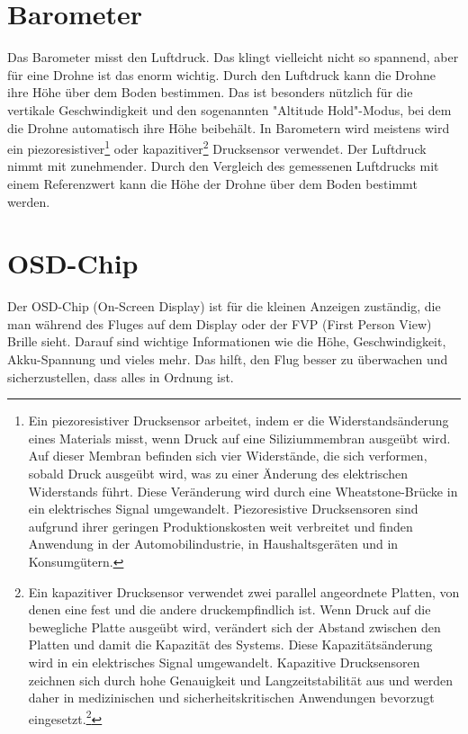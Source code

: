   \section{Barometer }  
Das Barometer misst den Luftdruck. Das klingt vielleicht nicht so spannend, aber für eine Drohne ist das enorm wichtig. Durch den Luftdruck kann die Drohne ihre Höhe über dem Boden bestimmen. Das ist besonders nützlich für die vertikale Geschwindigkeit und den sogenannten "Altitude Hold"-Modus, bei dem die Drohne automatisch ihre Höhe beibehält. In Barometern wird meistens wird ein piezoresistiver\footnote{Ein piezoresistiver Drucksensor arbeitet, indem er die Widerstandsänderung eines Materials misst, wenn Druck auf eine Siliziummembran ausgeübt wird. Auf dieser Membran befinden sich vier Widerstände, die sich verformen, sobald Druck ausgeübt wird, was zu einer Änderung des elektrischen Widerstands führt. Diese Veränderung wird durch eine Wheatstone-Brücke in ein elektrisches Signal umgewandelt. Piezoresistive Drucksensoren sind aufgrund ihrer geringen Produktionskosten weit verbreitet und finden Anwendung in der Automobilindustrie, in Haushaltsgeräten und in Konsumgütern.\cite{Corioliskraft}} oder kapazitiver\footnote{Ein kapazitiver Drucksensor verwendet zwei parallel angeordnete Platten, von denen eine fest und die andere druckempfindlich ist. Wenn Druck auf die bewegliche Platte ausgeübt wird, verändert sich der Abstand zwischen den Platten und damit die Kapazität des Systems. Diese Kapazitätsänderung wird in ein elektrisches Signal umgewandelt. Kapazitive Drucksensoren zeichnen sich durch hohe Genauigkeit und Langzeitstabilität aus und werden daher in medizinischen und sicherheitskritischen Anwendungen bevorzugt eingesetzt.\cite{Corioliskraft}\footnote{https://esenssys-com.translate.goog/capacitive-piezoresistive-pressure-sensors-differences/?\_x\_tr\_sl=en\&\_x\_tr\_tl=de\&\_x\_tr\_hl=dev\&\_x\_t\r\_pto=rq\#:~:text=Technology\\20comparison\%2C\%20capacitive\%20vs\%20piezoresistive,and\%20lower\%20total\%20error\%20band.}} Drucksensor verwendet. Der Luftdruck nimmt mit zunehmender. Durch den Vergleich des gemessenen Luftdrucks mit einem Referenzwert kann die Höhe der Drohne über dem Boden bestimmt werden.


\section{OSD-Chip } 
Der OSD-Chip (On-Screen Display) ist für die kleinen Anzeigen zuständig, die man während des Fluges auf dem Display oder der FVP (First Person View) Brille sieht. Darauf sind wichtige Informationen wie die Höhe, Geschwindigkeit, Akku-Spannung und vieles mehr. Das hilft, den Flug besser zu überwachen und sicherzustellen, dass alles in Ordnung ist.


